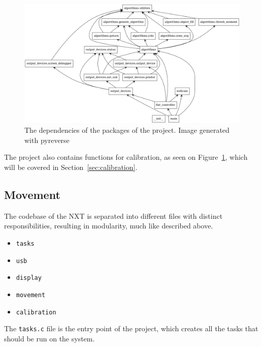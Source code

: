 \begin{figure}[H]
	\centering
	\includegraphics[width=\textwidth]{5.Solution/images/python_packages.png}
	\caption{The dependencies of the packages of the project{.} Image generated with pyreverse\cite{pyreverse}}
	\label{fig:pythonClasses}
\end{figure}


The project also contains functions for calibration, as seen on Figure~\ref{fig:pythonClasses}, which will be covered in Section~\ref{sec:calibration}.


\subsection{Movement}
The codebase of the NXT is separated into different files with distinct responsibilities, resulting in modularity, much like described above.

\begin{itemize}
	\item \texttt{tasks}
	\item \texttt{usb}
	\item \texttt{display}
	\item \texttt{movement}
	\item \texttt{calibration}
\end{itemize}

The \texttt{tasks.c} file is the entry point of the project, which creates all the tasks that should be run on the system.
